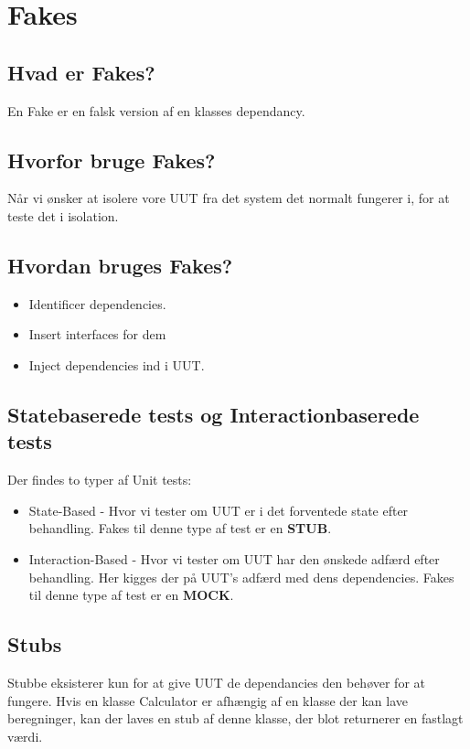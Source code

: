 \section{Fakes}

\subsection{Hvad er Fakes?}
En Fake er en falsk version af en klasses dependancy.

\subsection{Hvorfor bruge Fakes?}
Når vi ønsker at isolere vore UUT fra det system det normalt fungerer i, for at teste det i isolation.

\subsection{Hvordan bruges Fakes?}

\begin{itemize}
	\item Identificer dependencies.
	\item Insert interfaces for dem
	\item Inject dependencies ind i UUT. 
\end{itemize}

\subsection{Statebaserede tests og Interactionbaserede tests}
Der findes to typer af Unit tests:

\begin{itemize}
	\item State-Based - Hvor vi tester om UUT er i det forventede state efter behandling. Fakes til denne type af test er en \textbf{STUB}.
	\item Interaction-Based - Hvor vi tester om UUT har den ønskede adfærd efter behandling. Her kigges der på UUT's adfærd med dens dependencies. Fakes til denne type af test er en \textbf{MOCK}.
\end{itemize}

\subsection{Stubs}
Stubbe eksisterer kun for at give UUT de dependancies den behøver for at fungere.
Hvis en klasse Calculator er afhængig af en klasse der kan lave beregninger, kan der laves en stub af denne klasse, der blot returnerer en fastlagt værdi. 

